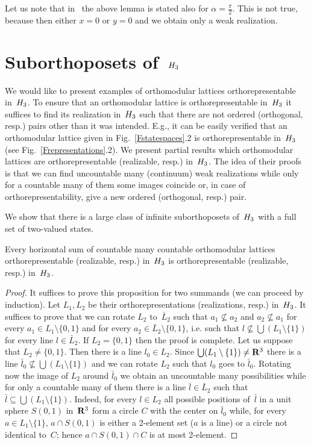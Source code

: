 Let us note that in~\cite{Kochen-Specker} the above lemma is stated also for
$\alpha = \frac {\pi}{2}$. This is not true, because then either $x=0$ or
$y=0$ and we obtain only a weak realization.




\section {Suborthoposets of~$H_3$}


We would like to present examples of orthomodular lattices
orthorepresentable in~$H_3$. To ensure that an orthomodular lattice is
orthorepresentable in~$H_3$ it suffices to find its realization in~$H_3$
such that there are not ordered (orthogonal, resp.) pairs other than it was
intended. E.g., it can be easily verified that an orthomodular lattice given
in Fig.~\ref{Fstatespaces}.2 is orthorepresentable in~$H_3$ (see
Fig.~\ref{Frepresentations}.2). We present partial results which
orthomodular lattices are orthorepresentable (realizable, resp.) in~$H_3$.
The idea of their proofs is that we can find uncountable many (continuum)
weak realizations while only for a countable many of them some images
coincide or, in case of orthorepresentability, give a new ordered
(orthogonal, resp.) pair.

We show that there is a large class of infinite suborthoposets of~$H_3$ with
a full set of two-valued states.


\begin {proposition} \label {representablesum}
Every horizontal sum of countable many countable orthomodular lattices
orthorepresentable (realizable, resp.) in~$H_3$ is orthorepresentable
(realizable, resp.) in~$H_3$.
\end {proposition}


\begin {proof}
It suffices to prove this proposition for two summands (we can proceed by
induction). Let $L_1,L_2$ be their orthorepresentations (realizations,
resp.) in~$H_3$. It suffices to prove that we can rotate $L_2$ to~$\bar L_2$
such that $a_1 \not\subseteq a_2$ and $a_2 \not\subseteq a_1$ for every $a_1
\in L_1 \setminus \{0,1\}$ and for every $a_2 \in \bar L_2 \setminus
\{0,1\}$, i.e. such that $l \not\subseteq \bigcup (L_1 \setminus \{1\})$ for
every line $l \in \bar L_2$. If $L_2 = \{0,1\}$ then the proof is complete.
Let us suppose that $L_2 \neq \{0,1\}$. Then there is a line $l_0 \in L_2$.
Since $\bigcup (L_1 \setminus \{1\}) \neq {\bf R}^3$ there is a line $\bar l_0
\not\subseteq \bigcup (L_1 \setminus \{1\})$ and we can rotate $L_2$ such
that $l_0$ goes to $\bar l_0$. Rotating now the image of $L_2$ around $\bar
l_0$ we obtain an uncountable many possibilities while for only a countable
many of them there is a line $\bar l \in \bar L_2$ such that $\bar l
\subseteq \bigcup (L_1 \setminus \{1\})$. Indeed, for every $l \in L_2$ all
possible positions of~$\bar l$ in a unit sphere $S(0,1)$ in~${\bf R}^3$ form a
circle $C$ with the center on $\bar l_0$ while, for every $a \in L_1
\setminus \{1\}$, $a \cap S(0,1)$ is either a 2-element set ($a$ is a line)
or a circle not identical to~$C$; hence $a \cap S(0,1) \cap C$ is at most
2-element.
\end {proof}


